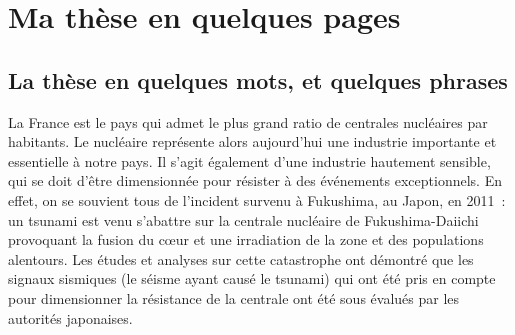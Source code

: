 \documentclass[a4paper]{book}
\begin{document}


\renewcommand{\thechapter}{\symbolchapt{chapter}}%


\chapter{Ma thèse en quelques pages}

\begin{abstract}[\hspace*{-10pt}]
  En quoi consiste cette thèse ? C'est la question à laquelle on cherche à répondre ici, en seulement quelques pages et trois minutes de lecture. 
  Cette annexe propose alors un résumé simple 
du  contexte, des enjeux et du travail apporté au cours de cette thèse.
  
\end{abstract}

\minitoc


\fancyhead[OR]{}


\section*{La thèse en quelques mots, et quelques phrases}

La France est le pays qui admet le plus grand ratio de centrales nucléaires par habitants. Le nucléaire représente alors aujourd'hui une industrie importante et essentielle à notre pays. Il s'agit également d'une industrie hautement sensible, qui se doit d'être dimensionnée pour résister à des événements exceptionnels. En effet, on se souvient tous de l'incident survenu à Fukushima, au Japon, en 2011~: un tsunami est venu s'abattre sur la centrale nucléaire de Fukushima-Daiichi provoquant la fusion du cœur et une irradiation de la zone et des populations alentours. Les études et analyses sur cette catastrophe ont démontré que les signaux sismiques (le séisme ayant causé le tsunami) qui ont été pris en compte pour dimensionner la résistance de la centrale ont été sous évalués par les autorités japonaises. 
\end{document}

